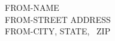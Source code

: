 \documentclass{article}
\begin{document}
\scriptsize
FROM-NAME\\
FROM-STREET ADDRESS\\
FROM-CITY, STATE, \ ZIP

\vspace{1.0in}\large
\setlength\parindent{0pt}

\begin{center}
\end{center}
\end{document}
